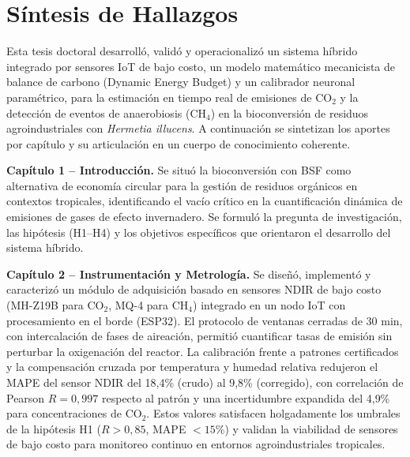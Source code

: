 \section{Síntesis de Hallazgos}
\label{sec:cap6_sintesis}

Esta tesis doctoral desarrolló, validó y operacionalizó un sistema híbrido integrado por sensores IoT de bajo costo, un modelo matemático mecanicista de balance de carbono (Dynamic Energy Budget) y un calibrador neuronal paramétrico, para la estimación en tiempo real de emisiones de CO$_2$ y la detección de eventos de anaerobiosis (CH$_4$) en la bioconversión de residuos agroindustriales con \emph{Hermetia illucens}. A continuación se sintetizan los aportes por capítulo y su articulación en un cuerpo de conocimiento coherente.

\textbf{Capítulo 1 -- Introducción.} Se situó la bioconversión con BSF como alternativa de economía circular para la gestión de residuos orgánicos en contextos tropicales, identificando el vacío crítico en la cuantificación dinámica de emisiones de gases de efecto invernadero. Se formuló la pregunta de investigación, las hipótesis (H1--H4) y los objetivos específicos que orientaron el desarrollo del sistema híbrido.

\textbf{Capítulo 2 -- Instrumentación y Metrología.} Se diseñó, implementó y caracterizó un módulo de adquisición basado en sensores NDIR de bajo costo (MH-Z19B para CO$_2$, MQ-4 para CH$_4$) integrado en un nodo IoT con procesamiento en el borde (ESP32). El protocolo de ventanas cerradas de 30 min, con intercalación de fases de aireación, permitió cuantificar tasas de emisión sin perturbar la oxigenación del reactor. La calibración frente a patrones certificados y la compensación cruzada por temperatura y humedad relativa redujeron el MAPE del sensor NDIR del 18{,}4\% (crudo) al 9{,}8\% (corregido), con correlación de Pearson $R = 0{,}997$ respecto al patrón y una incertidumbre expandida del 4{,}9\% para concentraciones de CO$_2$. Estos valores satisfacen holgadamente los umbrales de la hipótesis H1 ($R > 0{,}85$, MAPE $< 15$\%) y validan la viabilidad de sensores de bajo costo para monitoreo continuo en entornos agroindustriales tropicales.

